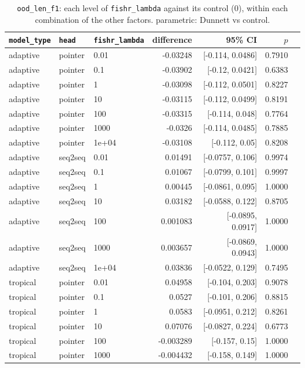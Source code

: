 \documentclass[10pt]{article}
\begin{document}
{\small
\begin{longtable}{lllrrrl}
\caption{\texttt{ood\_len\_f1}: each level of \texttt{fishr\_lambda} against its control (0), within each combination of the other factors. parametric: Dunnett vs control.}\label{tab:control-ood_len_f1}\\
\toprule
\texttt{model\_type} & \texttt{head} & \texttt{fishr\_lambda} & difference & 95\% CI & $p$ & \\
\midrule
\endhead
adaptive & pointer & 0.01 & -0.03248 & [-0.114, 0.0486] & 0.7910 & \\
adaptive & pointer & 0.1 & -0.03902 & [-0.12, 0.0421] & 0.6383 & \\
adaptive & pointer & 1 & -0.03098 & [-0.112, 0.0501] & 0.8227 & \\
adaptive & pointer & 10 & -0.03115 & [-0.112, 0.0499] & 0.8191 & \\
adaptive & pointer & 100 & -0.03315 & [-0.114, 0.048] & 0.7764 & \\
adaptive & pointer & 1000 & -0.0326 & [-0.114, 0.0485] & 0.7885 & \\
adaptive & pointer & 1e+04 & -0.03108 & [-0.112, 0.05] & 0.8208 & \\
adaptive & seq2seq & 0.01 & 0.01491 & [-0.0757, 0.106] & 0.9974 & \\
adaptive & seq2seq & 0.1 & 0.01067 & [-0.0799, 0.101] & 0.9997 & \\
adaptive & seq2seq & 1 & 0.00445 & [-0.0861, 0.095] & 1.0000 & \\
adaptive & seq2seq & 10 & 0.03182 & [-0.0588, 0.122] & 0.8705 & \\
adaptive & seq2seq & 100 & 0.001083 & [-0.0895, 0.0917] & 1.0000 & \\
adaptive & seq2seq & 1000 & 0.003657 & [-0.0869, 0.0943] & 1.0000 & \\
adaptive & seq2seq & 1e+04 & 0.03836 & [-0.0522, 0.129] & 0.7495 & \\
tropical & pointer & 0.01 & 0.04958 & [-0.104, 0.203] & 0.9078 & \\
tropical & pointer & 0.1 & 0.0527 & [-0.101, 0.206] & 0.8815 & \\
tropical & pointer & 1 & 0.0583 & [-0.0951, 0.212] & 0.8261 & \\
tropical & pointer & 10 & 0.07076 & [-0.0827, 0.224] & 0.6773 & \\
tropical & pointer & 100 & -0.003289 & [-0.157, 0.15] & 1.0000 & \\
tropical & pointer & 1000 & -0.004432 & [-0.158, 0.149] & 1.0000 & \\

\end{longtable}}
\end{document}
